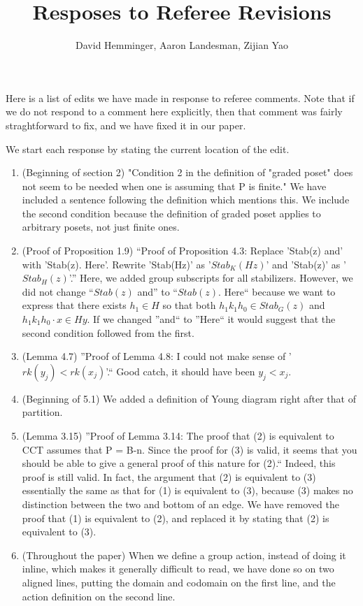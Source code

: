 \documentclass[10 pt]{amsart}
\title{Resposes to Referee Revisions}
\author{David Hemminger, Aaron Landesman, Zijian Yao}
\theoremstyle{plain}
\theoremstyle{definition}
\theoremstyle{remark}
\numberwithin{equation}{section}
\begin{document}
\maketitle

Here is a list of edits we have made in response to referee comments.
Note that if we do not respond to a comment here explicitly, then
that comment was fairly straghtforward to fix, and we have
fixed it in our paper.

We start each response by stating the current location of the edit.

\begin{enumerate}
	\item (Beginning of section 2) "Condition 2 in the definition of "graded poset" does not seem to be needed when one is assuming that P is finite."
We have included a sentence
		following the definition which mentions this.
		We include the second condition because the definition of graded poset applies to arbitrary
		posets, not just finite ones. 
	\item  (Proof of Proposition 1.9) ``Proof of Proposition 4.3:  Replace 'Stab(z) and' with 'Stab(z). Here'.  Rewrite 'Stab(Hz)' as '$Stab_K(Hz)$' and 'Stab(z)' as '$Stab_H(z)$'.''
		Here, we added group subscripts for all stabilizers.
		However, we did not change ``$Stab(z)$ and'' to ``$Stab(z)$. Here`` because we want to express that there exists $h_1 \in H$ so that both
		$h_1 k_1 h_0 \in Stab_G(z)$ and $h_1k_1h_0 \cdot x \in Hy$.
		If we changed ''and`` to ''Here`` it would suggest
		that the second condition followed from the first.
	\item (Lemma 4.7) ''Proof of Lemma 4.8:  I could not make sense of '$rk(y_j) < rk(x_j)$'.`` Good catch, it should have been $y_j < x_j$.
	\item (Beginning of 5.1) We added a definition of Young diagram right after that of partition.
	\item (Lemma 3.15) ''Proof of Lemma 3.14:  The proof that (2) is equivalent to CCT assumes that P = B-n.  Since the proof for (3) is valid, it seems that you should be able to give a general proof of this nature for (2).``
		Indeed, this proof is still valid. In fact, the argument that (2) is equivalent to (3) essentially the same as that for (1) is equivalent to (3), because (3) makes no distinction between the two and bottom of an edge. We have removed the proof that (1) is equivalent to (2), and replaced it by stating that (2) is equivalent to (3).
	\item (Throughout the paper) When we define a group action, instead of doing it inline, which makes it generally difficult to read, we have done so on two aligned lines, putting the domain and codomain on the first line, and the action definition on the second line.

\end{enumerate}
\end{document}
